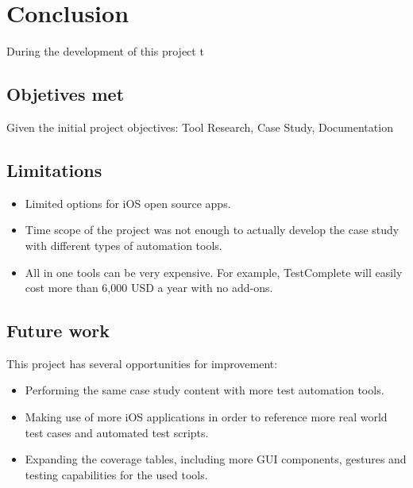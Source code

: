 %
\chapter{Conclusion}
\label{chapter5}

During the development of this project t

\section{Objetives met}
Given the initial project objectives: Tool Research, Case Study, Documentation

\section{Limitations}
	\begin{itemize}
		\item Limited options for iOS open source apps.
		\item Time scope of the project was not enough to actually develop the case study with different types of automation tools.
		\item All in one tools can be very expensive. For example, TestComplete will easily cost more than 6,000 USD a year with no add-ons.
	\end{itemize}


\section{Future work}

This project has several opportunities for improvement:

	\begin{itemize}
		\item Performing the same case study content with more test automation tools. 
		\item Making use of more iOS applications in order to reference more real world test cases and automated test scripts.
		\item Expanding the coverage tables, including more GUI components, gestures and testing capabilities for the used tools.
	\end{itemize}

